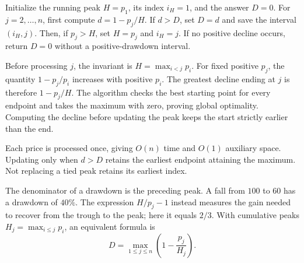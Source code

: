 Initialize the running peak $H=p_1$, its index $i_H=1$, and the answer $D=0$. For $j=2,\ldots,n$, first compute $d=1-p_j/H$. If $d>D$, set $D=d$ and save the interval $(i_H,j)$. Then, if $p_j>H$, set $H=p_j$ and $i_H=j$. If no positive decline occurs, return $D=0$ without a positive-drawdown interval.

Before processing $j$, the invariant is $H=\max_{i<j}p_i$. For fixed positive $p_j$, the quantity $1-p_j/p_i$ increases with positive $p_i$. The greatest decline ending at $j$ is therefore $1-p_j/H$. The algorithm checks the best starting point for every endpoint and takes the maximum with zero, proving global optimality. Computing the decline before updating the peak keeps the start strictly earlier than the end.

Each price is processed once, giving $O(n)$ time and $O(1)$ auxiliary space. Updating only when $d>D$ retains the earliest endpoint attaining the maximum. Not replacing a tied peak retains its earliest index.

The denominator of a drawdown is the preceding peak. A fall from $100$ to $60$ has a drawdown of $40\%$. The expression $H/p_j-1$ instead measures the gain needed to recover from the trough to the peak; here it equals $2/3$. With cumulative peaks $H_j=\max_{i\le j}p_i$, an equivalent formula is
\[
 \boxed{D=\max_{1\le j\le n}\left(1-\frac{p_j}{H_j}\right)}.
\]
